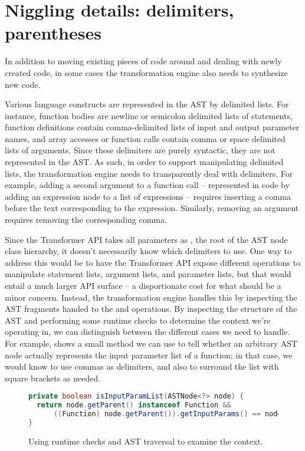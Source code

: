 \section{Niggling details: delimiters, parentheses}

In addition to moving existing pieces of code around and dealing with newly
created code, in some cases the transformation engine also needs to synthesize
new code.

Various \matlab language constructs are represented in the AST by delimited
lists. For instance, function bodies are newline or semicolon delimited lists
of statements, function definitions contain comma-delimited lists of input and
output parameter names, and array accesses or function calls contain comma or
space delimited lists of arguments. Since these delimiters are purely
syntactic, they are not represented in the AST. As such, in order to support
manipulating delimited lists, the transformation engine needs to transparently
deal with delimiters. For example, adding a second argument to a function call
-- represented in code by adding an expression node to a list of expressions --
requires inserting a comma before the text corresponding to the expression.
Similarly, removing an argument requires removing the corresponding comma.

Since the Transformer API takes all parameters as , the root
of the AST node class hierarchy, it doesn't necessarily know which delimiters
to use. One way to address this would be to have the Transformer API expose
different operations to manipulate statement lists, argument lists, and
parameter lists, but that would entail a much larger API surface -- a
disportionate cost for what should be a minor concern. Instead, the
transformation engine handles this by inspecting the AST fragments handed to
the  and  operations. By inspecting the structure
of the AST and performing some runtime checks to determine the context we're
operating in, we can distinguish between the different cases we need to handle.
For example,  shows a small method we can use to tell
whether an arbitrary AST node actually represents the input parameter list of a
function; in that case, we would know to use commas as delimiters, and also to
surround the list with square brackets as needed.

\begin{figure}
\begin{lstlisting}[language=Java]
private boolean isInputParamList(ASTNode<?> node) {
  return node.getParent() instanceof Function &&
      ((Function) node.getParent()).getInputParams() == node;
}
\end{lstlisting}
\caption{Using runtime checks and AST traversal to examine the context.}
\label{Fig:WhereAreWe}
\end{figure}

